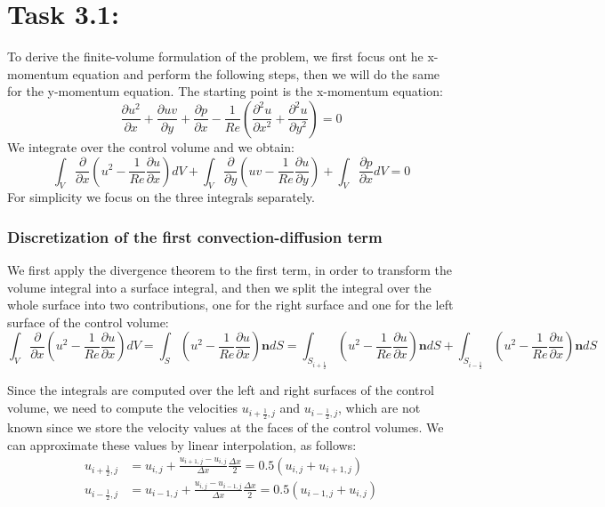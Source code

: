 \documentclass{article}
\begin{document}
\section*{\Large Task 3.1:}
To derive the finite-volume formulation of the problem, we first focus ont he x- momentum equation and perform the following steps, then we will do the same for the y-momentum equation. 
The starting point is the x-momentum equation:
\begin{equation}
    \frac{\partial u^2}{\partial x} + \frac{\partial uv}{\partial y} + \frac{\partial p}{\partial x} -\frac{1}{Re} (\frac{\partial^2 u}{\partial x^2} + \frac{\partial^2 u}{\partial y^2}) = 0
\end{equation}
We integrate over the control volume and we obtain:
\begin{equation}
    \int_{V} \frac{\partial}{\partial x} (u^2 - \frac{1}{Re} \frac{\partial u}{\partial x}) dV + \int_{V} \frac{\partial}{\partial y} (uv - \frac{1}{Re} \frac{\partial u}{\partial y}) + \int_{V} \frac{\partial p}{\partial x} dV = 0
\end{equation}
For simplicity we focus on the three integrals separately.

\subsubsection*{Discretization of the first convection-diffusion term}
We first apply the divergence theorem to the first term, in order to transform the volume integral into a surface integral, and then we split the integral over the whole surface into two contributions, one for the right surface and one for the left surface of the control volume:
\begin{equation} \label{discr_1}
  \int_{V} \frac{\partial}{\partial x} (u^2 - \frac{1}{Re} \frac{\partial u}{\partial x}) dV = \int_{S} (u^2 - \frac{1}{Re} \frac{\partial u}{\partial x}) \mathbf{n} dS = \int_{S_{i + \frac{1}{2}}} (u^2 - \frac{1}{Re} \frac{\partial u}{\partial x}) \mathbf{n} dS + \int_{S_{i - \frac{1}{2}}} (u^2 - \frac{1}{Re} \frac{\partial u}{\partial x}) \mathbf{n} dS
\end{equation}

Since the integrals are computed over the left and right surfaces of the control volume, we need to compute the velocities $u_{i + \frac{1}{2},j}$ and $u_{i - \frac{1}{2},j}$, which are not known since we store the velocity values at the faces of the control volumes. We can approximate these values by linear interpolation, as follows:
\begin{equation}
\begin{aligned}
  u_{i + \frac{1}{2},j} &= u_{i, j} + \frac{u_{i+1,j} - u_{i,j}}{\Delta x} \frac{\Delta x}{2} = 0.5 (u_{i,j} + u_{i+1,j})\\
  u_{i - \frac{1}{2},j} &= u_{i-1, j} + \frac{u_{i,j} - u_{i-1,j}}{\Delta x} \frac{\Delta x}{2} = 0.5 (u_{i-1,j} + u_{i,j})
\end{aligned}
\end{equation}
\end{document}
